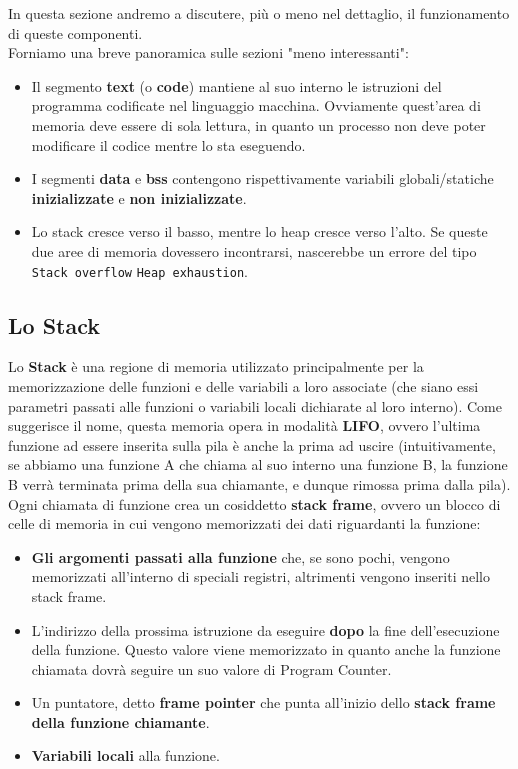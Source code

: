 \documentclass[12pt]{report}
\begin{document}
	In questa sezione andremo a discutere, più o meno nel dettaglio, il funzionamento di queste componenti.\\
	Forniamo una breve panoramica sulle sezioni "meno interessanti":
	\begin{itemize}
		\item Il segmento \textbf{text} (o \textbf{code}) mantiene al suo interno le istruzioni del programma codificate nel linguaggio macchina. Ovviamente quest'area di memoria deve essere di sola lettura, in quanto un processo non deve poter modificare il codice mentre lo sta eseguendo.
		
		\item I segmenti \textbf{data} e \textbf{bss} contengono rispettivamente variabili globali/statiche \textbf{inizializzate} e \textbf{non inizializzate}.
		
		\item Lo stack cresce verso il basso, mentre lo heap cresce verso l'alto. Se queste due aree di memoria dovessero incontrarsi, nascerebbe un errore del tipo \texttt{Stack overflow} \texttt{Heap exhaustion}.
	\end{itemize}
	
	\subsection{Lo Stack}
	Lo \textbf{Stack} è una regione di memoria utilizzato principalmente per la memorizzazione delle funzioni e delle variabili a loro associate (che siano essi parametri passati alle funzioni o variabili locali dichiarate al loro interno).
	Come suggerisce il nome, questa memoria opera in modalità \textbf{LIFO}, ovvero l'ultima funzione ad essere inserita sulla pila è anche la prima ad uscire (intuitivamente, se abbiamo una funzione A che chiama al suo interno una funzione B, la funzione B verrà terminata prima della sua chiamante, e dunque rimossa prima dalla pila).
	\smallbreak
	Ogni chiamata di funzione crea un cosiddetto \textbf{stack frame}, ovvero un blocco di celle di memoria in cui vengono memorizzati dei dati riguardanti la funzione:
	\begin{itemize}
		\item \textbf{Gli argomenti passati alla funzione} che, se sono pochi, vengono memorizzati all'interno di speciali registri, altrimenti vengono inseriti nello stack frame.
		
		\item L'indirizzo della prossima istruzione da eseguire \textbf{dopo} la fine dell'esecuzione della funzione. Questo valore viene memorizzato in quanto anche la funzione chiamata dovrà seguire un suo valore di Program Counter.
		
		\item Un puntatore, detto \textbf{frame pointer} che punta all'inizio dello \textbf{stack frame della funzione chiamante}.
		
		\item \textbf{Variabili locali} alla funzione.
	\end{itemize}
	
\end{document}
